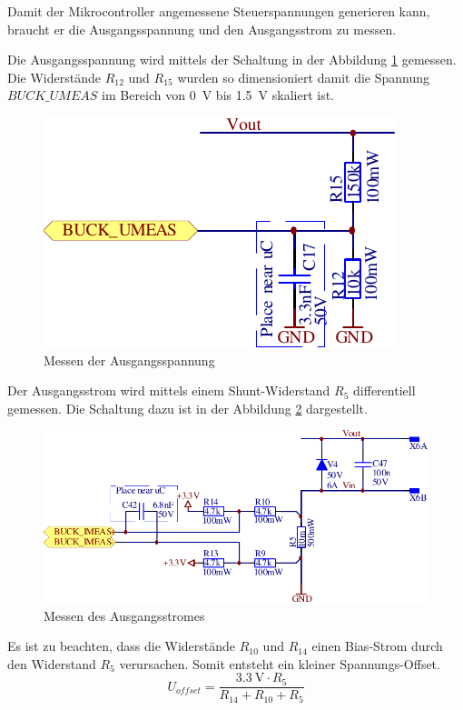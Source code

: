 Damit der Mikrocontroller angemessene Steuerspannungen  generieren kann, braucht
er die Ausgangsspannung und den Ausgangsstrom zu messen.

Die   Ausgangsspannung   wird   mittels   der   Schaltung   in   der   Abbildung
\ref{fig:circuit:buck:umeas} gemessen. Die Widerst\"ande $R_{12}$  und  $R_{15}$
wurden  so  dimensioniert  damit  die  Spannung  $BUCK\_UMEAS$  im  Bereich  von
\SI{0}{\volt} bis \SI{1.5}{\volt} skaliert ist.

\begin{figure}[th!]
    \center
    \includegraphics[width=.45\textwidth]{images/circuit/buck-umeas.pdf}
    \caption{Messen der Ausgangsspannung}
    \label{fig:circuit:buck:umeas}
\end{figure}

Der  Ausgangsstrom  wird  mittels  einem  Shunt-Widerstand  $R_5$  differentiell
gemessen.  Die  Schaltung dazu ist in der Abbildung \ref{fig:circuit:buck:imeas}
dargestellt.

\begin{figure}[th!]
    \center
    \includegraphics[width=.85\textwidth]{images/circuit/buck-imeas.pdf}
    \caption{Messen des Ausgangsstromes}
    \label{fig:circuit:buck:imeas}
\end{figure}

Es  ist  zu  beachten,  dass  die  Widerst\"ande  $R_{10}$  und  $R_{14}$  einen
Bias-Strom durch den Widerstand $R_5$  verursachen.  Somit  entsteht ein kleiner
Spannungs-Offset.
\begin{equation}
    U_{offset} = \frac{ \SI{3.3}{\volt} \cdot R_5 }{ R_{14} + R_{10} + R_5 }
    \label{eq:circuit:buck:shunt_offset}
\end{equation}

